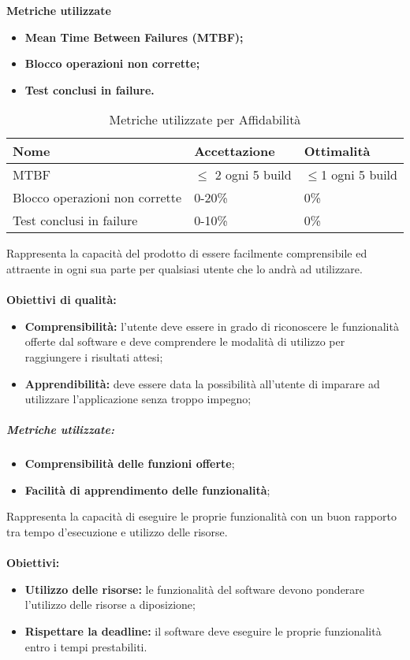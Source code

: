 \textbf{Metriche utilizzate}
\begin{itemize}
	\item \textbf{Mean Time Between Failures (MTBF)\pedice;}
	\item \textbf{Blocco operazioni non corrette;}
	\item \textbf{Test conclusi in failure.}
\end{itemize}
\begin{table}[!htpb]
	\centering
	\renewcommand{\arraystretch}{2} 
	\begin{tabular}{|l|l|l|}
		\rowcolor{orange!50}
		\hline
		\textbf{Nome} &  \textbf{Accettazione} & \textbf{Ottimalità} \\ \hline
		MTBF     & $\leq$ 2 ogni 5 build & $\leq$1 ogni 5 build          \\ \hline
		Blocco operazioni non corrette   &    0-20\% &  0\%       \\ \hline
		Test conclusi in failure          &     0-10\%          &      0\%        \\ \hline
	\end{tabular}
	\caption{Metriche utilizzate per Affidabilità}
\end{table}
Rappresenta la capacità del prodotto di essere facilmente comprensibile ed attraente in ogni sua parte per qualsiasi utente che lo andrà ad utilizzare.\\\\
\textbf{Obiettivi di qualità:}
\begin{itemize}
    \item \textbf{Comprensibilità:} l’utente deve essere in grado di riconoscere le funzionalità offerte dal software e deve comprendere le modalità di utilizzo per raggiungere i risultati attesi;
    \item \textbf{Apprendibilità:} deve essere data la possibilità all'utente di imparare ad utilizzare l’applicazione senza troppo impegno;
\end{itemize}
\subparagraph{Metriche utilizzate:}
\begin{itemize}
    \item \textbf{Comprensibilità delle funzioni offerte};
    \item \textbf{Facilità di apprendimento delle funzionalità};
\end{itemize}

Rappresenta la capacità di eseguire le proprie funzionalità con un buon rapporto tra tempo d'esecuzione e utilizzo delle risorse.\\\\
\textbf{Obiettivi:}
\begin{itemize}
	\item \textbf{Utilizzo delle risorse:} le funzionalità del software devono ponderare l'utilizzo delle risorse a diposizione;
	\item \textbf{Rispettare la deadline:} il software deve eseguire le proprie funzionalità entro i tempi prestabiliti.
\end{itemize}

